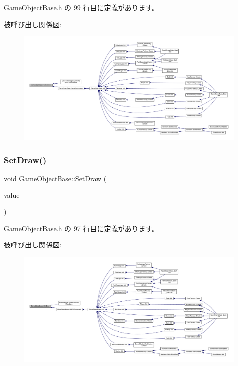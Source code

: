  Game\+Object\+Base.\+h の 99 行目に定義があります。

被呼び出し関係図\+:\nopagebreak
\begin{figure}[H]
\begin{center}
\leavevmode
\includegraphics[width=350pt]{class_game_object_base_a4aeb0212f5a390570d050bfef51b7818_icgraph}
\end{center}
\end{figure}
\mbox{\label{class_game_object_base_ab548b4208b8da2af6e3abb533ea53da9}} 
\subsubsection{\texorpdfstring{Set\+Draw()}{SetDraw()}}
{\footnotesize\ttfamily void Game\+Object\+Base\+::\+Set\+Draw (\begin{DoxyParamCaption}\item[{\mbox{\hyperlink{class_draw_base}{Draw\+Base}} $\ast$}]{value }\end{DoxyParamCaption})\hspace{0.3cm}{\ttfamily [inline]}}



 Game\+Object\+Base.\+h の 97 行目に定義があります。

被呼び出し関係図\+:\nopagebreak
\begin{figure}[H]
\begin{center}
\leavevmode
\includegraphics[width=350pt]{class_game_object_base_ab548b4208b8da2af6e3abb533ea53da9_icgraph}
\end{center}
\end{figure}
\mbox{\label{class_game_object_base_a71704e8310b3183f3f88869f8fd27d08}} 
